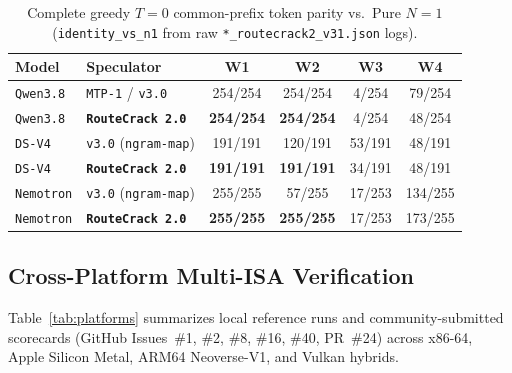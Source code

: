 \documentclass[10pt,twocolumn]{article}
\begin{document}
\begin{table}[t]
\centering
\caption{Complete greedy $T=0$ common-prefix token parity vs.\ Pure $N=1$ (\texttt{identity\_vs\_n1} from raw \texttt{*\_routecrack2\_v31.json} logs).}
\label{tab:identity}
\scriptsize
\setlength{\tabcolsep}{3.2pt}
\begin{tabularx}{\columnwidth}{@{}lLcccc@{}}
\toprule
\textbf{Model} & \textbf{Speculator} & \textbf{W1} & \textbf{W2} & \textbf{W3} & \textbf{W4} \\
\midrule
\texttt{Qwen3.8} & \texttt{MTP-1} / \texttt{v3.0} & 254/254 & 254/254 & 4/254 & 79/254 \\
\texttt{Qwen3.8} & \textbf{\texttt{RouteCrack 2.0}} & \textbf{254/254} & \textbf{254/254} & 4/254 & 48/254 \\
\midrule
\texttt{DS-V4} & \texttt{v3.0} (\texttt{ngram-map}) & 191/191 & 120/191 & 53/191 & 48/191 \\
\texttt{DS-V4} & \textbf{\texttt{RouteCrack 2.0}} & \textbf{191/191} & \textbf{191/191} & 34/191 & 48/191 \\
\midrule
\texttt{Nemotron} & \texttt{v3.0} (\texttt{ngram-map}) & 255/255 & 57/255 & 17/253 & 134/255 \\
\texttt{Nemotron} & \textbf{\texttt{RouteCrack 2.0}} & \textbf{255/255} & \textbf{255/255} & 17/253 & 173/255 \\
\bottomrule
\end{tabularx}
\end{table}

\subsection{Cross-Platform Multi-ISA Verification}
Table~\ref{tab:platforms} summarizes local reference runs and community-submitted scorecards (GitHub Issues~\#1, \#2, \#8, \#16, \#40, PR~\#24) across x86-64, Apple Silicon Metal, ARM64 Neoverse-V1, and Vulkan hybrids.
\end{document}
